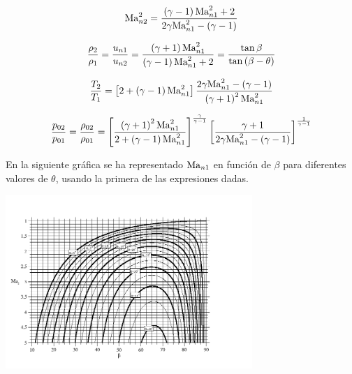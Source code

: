 	
	
	\begin{equation}
		\text{Ma}_{n2}^{2}=\frac{\left(\gamma-1\right)\text{Ma}_{n1}^{2}+2}{2\gamma\text{Ma}_{n1}^{2}-(\gamma-1)}
	\end{equation}
	
	

	
	
	\begin{equation}
		\frac{\rho_{2}}{\rho_{1}}=\frac{u_{n1}}{u_{n2}}=\frac{\left(\gamma+1\right)\text{Ma}_{n1}^{2}}{\left(\gamma-1\right)\text{Ma}_{n1}^{2}+2}=\frac{\tan\beta}{\tan\left(\beta-\theta\right)}
	\end{equation}
	
	
	
	\begin{equation}
		\frac{T_{2}}{T_{1}}=\left[2+\left(\gamma-1\right)\text{Ma}_{n1}^{2}\right]\frac{2\gamma\text{Ma}_{n1}^{2}-\left(\gamma-1\right)}{\left(\gamma+1\right)^{2}\text{Ma}_{n1}^{2}}
	\end{equation}
	
	
	
	\begin{equation}
		\frac{p_{02}}{p_{01}}=\frac{\rho_{02}}{\rho_{01}}=\left[\frac{\left(\gamma+1\right)^{2}\text{Ma}_{n1}^{2}}{2+\left(\gamma-1\right)\text{Ma}_{n1}^{2}}\right]^{\frac{\gamma}{\gamma-1}}\left[\frac{\gamma+1}{2\gamma\text{Ma}_{n1}^{2}-\left(\gamma-1\right)}\right]^{\frac{1}{\gamma-1}}
	\end{equation}
	
	
	En la siguiente gráfica se ha representado $\text{Ma}_{n1}$ en función
	de $\beta$ para diferentes valores de $\theta$, usando la primera
	de las expresiones dadas. 

	
	\begin{center}
		\includegraphics[width=0.7\textwidth]{TeX_files/chapter11-Compresible/oblicuas}
		\par\end{center}
	
